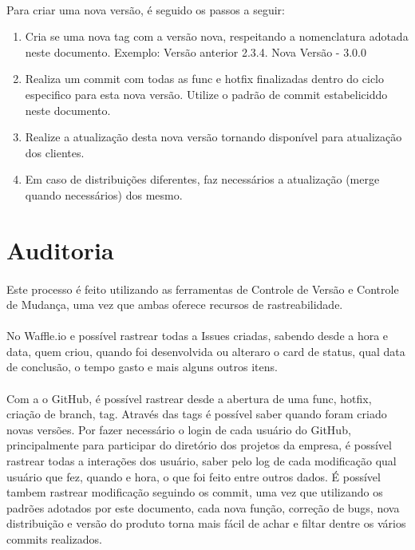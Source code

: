 \documentclass[	DIV=calc,%
							paper=a4,%
							fontsize=12pt,%
							onecolumn]{scrartcl}	 					%
\begin{document}
\paragraph{}
Para criar uma nova versão, é seguido os passos a seguir:
\begin{enumerate}
	\item Cria se uma nova tag com a versão nova, respeitando a nomenclatura adotada neste documento. Exemplo: Versão anterior 2.3.4. Nova Versão - 3.0.0
	\item Realiza um commit com todas as func e hotfix finalizadas dentro do ciclo especifico para esta nova versão. Utilize o padrão de commit estabeliciddo neste documento.
	\item Realize a atualização desta nova versão tornando disponível para atualização dos clientes.
	\item Em caso de distribuições diferentes, faz necessários a atualização (merge quando necessários) dos mesmo.
\end{enumerate}

\section{Auditoria}
\paragraph{}
Este processo é feito utilizando as ferramentas de Controle de Versão e Controle de Mudança, uma vez que ambas oferece recursos de rastreabilidade. 
\paragraph{}
No Waffle.io e possível rastrear todas a Issues criadas, sabendo desde a hora e data, quem criou, quando foi desenvolvida ou alteraro o card de status, qual data de conclusão, o tempo gasto e mais alguns outros itens.
\paragraph{}
Com a o GitHub, é possível rastrear desde a abertura de uma func, hotfix, criação de branch, tag. Através das tags é possível saber quando foram criado novas versões. Por fazer necessário o login de cada usuário do GitHub, principalmente para participar do diretório dos projetos da empresa, é possível rastrear todas a interações dos usuário, saber pelo log de cada modificação qual usuário que fez, quando e hora, o que foi feito entre outros dados. É possível tambem rastrear modificação seguindo os commit, uma vez que utilizando os padrões adotados por este documento, cada nova função, correção de bugs, nova distribuição e versão do produto torna mais fácil de achar  e filtar dentre os vários commits realizados.
\end{document}
